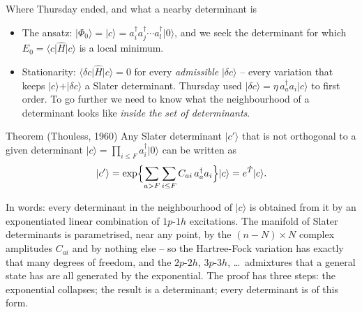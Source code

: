 \documentclass[aspectratio=169,10pt]{beamer}
\newcommand{\ket}[1]{\vert #1\rangle}
\newcommand{\element}[3]{\langle #1\vert #2\vert #3\rangle}
\begin{document}
\begin{frame}{Where Thursday ended, and what a nearby determinant is}
  \footnotesize
  \begin{itemize}
    \item The ansatz: $\ket{\Phi_0}=\ket{c}=a_i^{\dagger}a_j^{\dagger}\cdots a_l^{\dagger}\ket{0}$, and we seek the determinant for which $E_0=\element{c}{\hat{H}}{c}$ is a local minimum.
    \item Stationarity: $\element{\delta c}{\hat{H}}{c}=0$ for every \emph{admissible} $\ket{\delta c}$ -- every variation that keeps $\ket{c}+\ket{\delta c}$ a Slater determinant. Thursday used $\ket{\delta c}=\eta\,a_a^{\dagger}a_i\ket{c}$ to first order. To go further we need to know what the neighbourhood of a determinant looks like \emph{inside the set of determinants}.
  \end{itemize}
  \begin{block}{Theorem (Thouless, 1960)}
    Any Slater determinant $\ket{c'}$ that is not orthogonal to a given determinant $\ket{c}=\prod_{i\le F}a_i^{\dagger}\ket{0}$ can be written as
    \[
      \ket{c'}=\exp\Bigl\{\sum_{a>F}\sum_{i\le F}C_{ai}\,a_a^{\dagger}a_i\Bigr\}\ket{c}=e^{\hat{T}}\ket{c}.
    \]
  \end{block}
  In words: every determinant in the neighbourhood of $\ket{c}$ is obtained from it by an exponentiated linear combination of $1p$-$1h$ excitations. The manifold of Slater determinants is parametrised, near any point, by the $(n-N)\times N$ complex amplitudes $C_{ai}$ \alert{and by nothing else} -- so the Hartree-Fock variation has exactly that many degrees of freedom, and the $2p$-$2h$, $3p$-$3h$, \dots\ admixtures that a general state has are all generated by the exponential.
  \vspace{0.3em}
  The proof has three steps: the exponential collapses; the result is a determinant; every determinant is of this form.
\end{frame}
\end{document}
